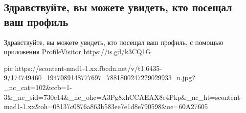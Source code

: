 
 
 
 
 
\subsection{Здравствуйте, вы можете увидеть, кто посещал ваш профиль}

Здравствуйте, вы можете увидеть, кто посещал ваш профиль, с помощью приложения ProfileVisitor \url{https://is.gd/k3CQ1G}

\ifcmt
  pic https://scontent-mad1-1.xx.fbcdn.net/v/t1.6435-9/174749460_1947089148777697_7881800247229029933_n.jpg?_nc_cat=102&ccb=1-3&_nc_sid=730e14&_nc_ohc=A3Pg8xhCCAEAX8c4Pkp&_nc_ht=scontent-mad1-1.xx&oh=08137c0876a863b583ee7e1d8e790598&oe=60A27605
\fi

